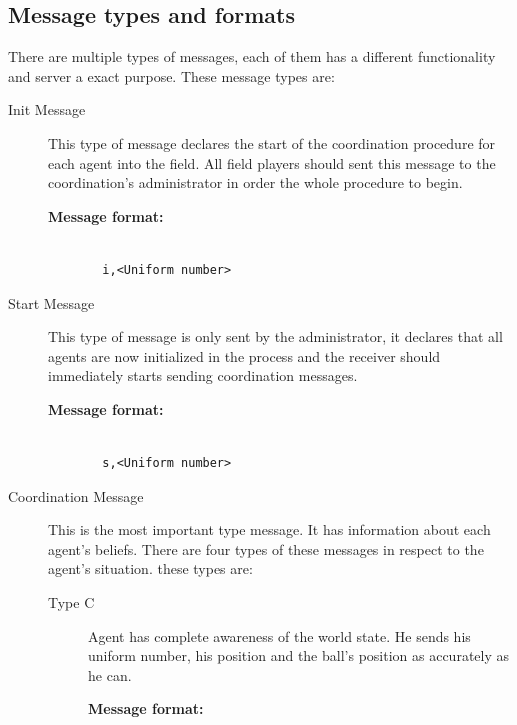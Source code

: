 \subsection{Message types and formats}
There are multiple types of messages, each of them has a different functionality and server a exact purpose. These message types are:
\begin{description}
\item[Init Message] This type of message declares the start of the coordination procedure for each agent into the field. All field players should sent this message to the coordination's administrator in order the whole procedure to begin.

\begin{description}
  \item[{\bf Message format:}]
  \begin{verbatim}
  
  i,<Uniform number>
  \end{verbatim}
\end{description}

\item[Start Message] This type of message is only sent by the administrator, it declares that all agents are now initialized in the process and the receiver should immediately starts sending coordination messages.

\begin{description}
  \item[{\bf Message format:}]
  \begin{verbatim}
  
  s,<Uniform number>
  \end{verbatim}
\end{description}

\item[Coordination Message] This is the most important type message. It has information about each agent's beliefs. There are four types of these messages in respect to the agent's situation. these types are:
\begin{description}

\item[Type C] Agent has complete awareness of the world state. He sends his uniform number, his position and the ball's position as accurately as he can.

\begin{description}
  \item[{\bf Message format:}]
  \begin{verbatim}
  

\end{verbatim}
\end{description}
\end{description}
\end{description}
